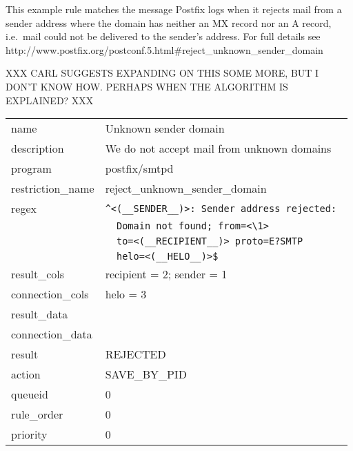 \documentclass[a4paper,12pt,draft]{article}
\begin{document}
This example rule matches the message Postfix logs when it rejects mail
from a sender address where the domain has neither an MX record nor an A
record, i.e.\ mail could not be delivered to the sender's address.  For full
details see
http://www.postfix.org/postconf.5.html\#reject\_unknown\_sender\_domain

XXX CARL SUGGESTS EXPANDING ON THIS SOME MORE, BUT I DON'T KNOW HOW\@.
PERHAPS WHEN THE ALGORITHM IS EXPLAINED\@? XXX

\begin{tabular}[]{ll}

name                & Unknown sender domain                             \\
description         & We do not accept mail from unknown domains        \\
program             & postfix/smtpd                                     \\
restriction\_name   & reject\_unknown\_sender\_domain                   \\
regex               & \verb!^<(__SENDER__)>: Sender address rejected: ! \\
                    & \verb!  Domain not found; from=<\1> !             \\
                    & \verb!  to=<(__RECIPIENT__)> proto=E?SMTP !       \\
                    & \verb!  helo=<(__HELO__)>$!                       \\
result\_cols        & recipient = 2; sender = 1                         \\
connection\_cols    & helo = 3                                          \\
result\_data        &                                                   \\
connection\_data    &                                                   \\
result              & REJECTED                                          \\
action              & SAVE\_BY\_PID                                     \\
queueid             & 0                                                 \\
rule\_order         & 0                                                 \\
priority            & 0                                                 \\

\end{tabular}
\end{document}
